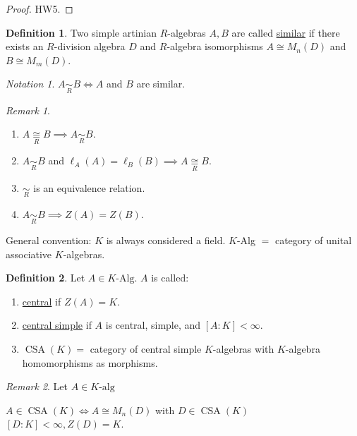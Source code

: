 \documentclass{article}
\theoremstyle{definition}
\newtheorem*{definition}{Definition}
\theoremstyle{plain}
\theoremstyle{remark}
\newtheorem*{remark*}{Remark}
\newtheorem*{notation*}{Notation}
\begin{document}
    \begin{proof}
        HW5.
    \end{proof}

    \begin{definition}
        Two simple artinian \(R\)-algebras \(A, B\) are called \underline{similar} if there exists an \(R\)-division algebra \(D\) and \(R\)-algebra isomorphisms \(A \cong M_n(D)\) and \(B\cong M_m(D)\). 
    \end{definition}

    \begin{notation*}
        \(A \underset{R}{\sim} B \iff A\) and \(B\) are similar.
    \end{notation*}

    \begin{remark*}
        \begin{enumerate}[label=\arabic*)]
            \item \(A \underset{R}{\cong} B \implies A \underset{R}{\sim} B\).
            \item \(A \underset{R}{\sim} B\) and \(\ell_A(A) = \ell_B(B) \implies A \underset{R}{\cong} B\).
            \item \(\underset{R}{\sim}\) is an equivalence relation.
            \item \(A \underset{R}{\sim} B \implies Z(A) = Z(B)\).
        \end{enumerate} 
    \end{remark*}

    General convention: \(K\) is always considered a field. \(K\)-Alg \(=\) category of unital associative \(K\)-algebras.

    \begin{definition}
        Let \(A\in K\text{-Alg}\). \(A\) is called:

        \begin{enumerate}[label=\roman*)]
            \item \underline{central} if \(Z(A) = K\).
            \item \underline{central simple} if \(A\) is central, simple, and \([A:K] < \infty\).
            \item \(\operatorname{CSA}(K) = \) category of central simple \(K\)-algebras with \(K\)-algebra homomorphisms as morphisms.
        \end{enumerate} 
    \end{definition}

    \begin{remark*}
        Let \(A\in K\text{-alg}\)

        \(A \in \operatorname{CSA}(K) \iff A \cong M_n(D)\) with \(D\in \operatorname{CSA}(K)\) \([D:K] < \infty , Z(D) = K\).
    \end{remark*}
\end{document}
